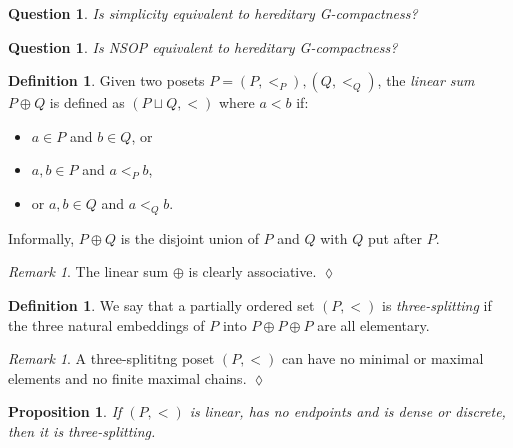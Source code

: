 \documentclass[final,a4paper,12pt]{amsart}
\newtheorem{prop}[thm]{Proposition}
\newtheorem{qu}[thm]{Question}
\theoremstyle{remark}
\newtheorem{rem}[thm]{Remark}
\theoremstyle{definition}
\newtheorem{dfn}[thm]{Definition}
\newcommand{\xqed}[1]{%
	\leavevmode\unskip\penalty9999 \hbox{}\nobreak\hfill
	\quad\hbox{\ensuremath{#1}}}
\begin{document}
	
	
	
	\begin{qu}
		Is simplicity equivalent to hereditary G-compactness?
	\end{qu}
	
	\begin{qu}
		Is NSOP equivalent to hereditary G-compactness?
	\end{qu}
	
	\begin{dfn}
		Given two posets $P=(P,<_P),(Q,<_Q)$, the \emph{linear sum} $P\oplus Q$ is defined as $(P\sqcup Q,<)$ where $a<b$ if:
		\begin{itemize}
			\item
			$a\in P$ and $b\in Q$, or
			\item
			$a,b\in P$ and $a<_Pb$,
			\item
			or $a,b\in Q$ and $a<_Qb$.
		\end{itemize}
	\end{dfn}
	Informally, $P\oplus Q$ is the disjoint union of $P$ and $Q$ with $Q$ put after $P$.
	
	\begin{rem}
		The linear sum $\oplus$ is clearly associative.\xqed{\lozenge}
	\end{rem}
	
	\begin{dfn}
		We say that a partially ordered set $(P,<)$ is \emph{three-splitting} if the three natural embeddings of $P$ into $P\oplus P\oplus P$ are all elementary.
	\end{dfn}
	
	\begin{rem}
		A three-splititng poset $(P,<)$ can have no minimal or maximal elements and no finite maximal chains.\xqed{\lozenge}
	\end{rem}
	
	\begin{prop}
		If $(P,<)$ is linear, has no endpoints and is dense or discrete, then it is three-splitting.
	\end{prop}
	
\end{document}
